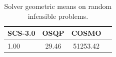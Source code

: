 \begin{table}
\centering
\caption{Solver geometric means on random infeasible problems.}
\label{t-random infeasible-geom_mean}
\begin{tabular}{lccc}
\toprule
 SCS-3.0 &  OSQP &    COSMO \\
\midrule
    1.00 & 29.46 & 51253.42 \\
\bottomrule
\end{tabular}
\end{table}
